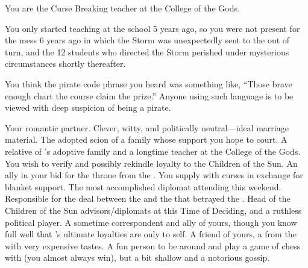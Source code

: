 \documentclass[char]{GL2020}
\begin{document}
\begin{itemz}[Notes]
	\item You are the Curse Breaking teacher at the College of the Gods.
	\item You only started teaching at the school 5 years ago, so you were not present for the mess 6 years ago in which the Storm was unexpectedly sent to the \pShip{} out of turn, and the 12 students who directed the Storm perished under mysterious circumstances shortly thereafter.
	\item You think the pirate code phrase you heard was something like, ``Those brave enough chart the course claim the prize.'' Anyone using such language is to be viewed with deep suspicion of being a pirate.
\end{itemz}

\begin{contacts}
	\contact{\cPirate{}} Your romantic partner. Clever, witty, and politically neutral---ideal marriage material.
	\contact{\cAdopted{}} The adopted scion of a family whose support you hope to court.
	\contact{\cMusic{}} A relative of \cAdopted{}'s adoptive family and a longtime teacher at the College of the Gods. You wish to verify and possibly rekindle \cMusic{\their} loyalty to the Children of the Sun.
	\contact{\cAntiChup{}} An ally in your bid for the throne from the \pTech{}. You supply \cAntiChup{\them} with curses in exchange for blanket support.
	\contact{\cDiplomat{}} The most accomplished diplomat attending this weekend. Responsible for the deal between the \pFarm{} and the \pTech{} that betrayed the \pShip{}.
	\contact{\cEvil{}} Head of the Children of the Sun advisors/diplomats at this Time of Deciding, and a ruthless political player. A sometime correspondent and ally of yours, though you know full well that \cEvil{}'s ultimate loyalties are only to \cEvil{\them}self.
            \contact{\cHedonist{}} A friend of yours, a \cHedonist{\cleric} from the \pFarm{} with very expensive tastes. A fun person to be around and play a game of chess with (you almost always win), but a bit shallow and a notorious gossip.
\end{contacts}
\end{document}
